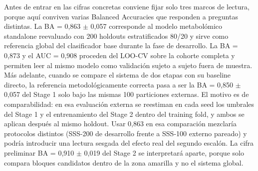 Antes de entrar en las cifras concretas conviene fijar solo tres marcos de lectura, porque aquí conviven varias
Balanced Accuracies que responden a preguntas distintas. La BA = 0,863 $\pm$ 0,057 corresponde al modelo metabolómico
standalone reevaluado con 200 holdouts estratificados 80/20 y sirve como referencia global del clasificador base durante
la fase de desarrollo. La BA = 0,873 y el AUC = 0,908 proceden del LOO-CV sobre la cohorte completa y permiten leer al
mismo modelo como validación sujeto a sujeto fuera de muestra. Más adelante, cuando se compare el sistema de dos etapas
con su baseline directo, la referencia metodológicamente correcta pasa a ser la BA = 0,850 $\pm$ 0,057 del Stage 1 solo
bajo las mismas 100 particiones externas. El motivo es de comparabilidad: en esa evaluación externa se reestiman en cada
seed los umbrales del Stage 1 y el entrenamiento del Stage 2 dentro del training fold, y ambos se aplican después al
mismo holdout. Usar 0,863 en esa comparación mezclaría protocolos distintos (SSS-200 de desarrollo frente a SSS-100
externo pareado) y podría introducir una lectura sesgada del efecto real del segundo escalón. La cifra preliminar BA =
0,910 $\pm$ 0,019 del Stage 2 se interpretará aparte, porque solo compara bloques candidatos dentro de la zona amarilla y no el
sistema global.

\begin{table}[ht]
\centering
\caption{Resumen jerárquico de Balanced Accuracy según modelo y esquema de evaluación.}
\label{tab:ba_summary_hierarchy}
\small
\setlength{\tabcolsep}{6pt}
\end{table}

